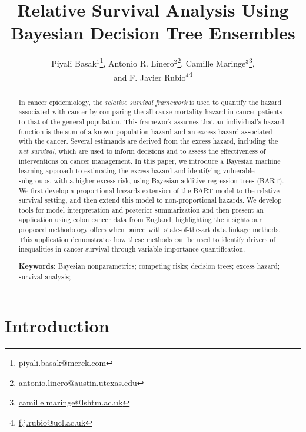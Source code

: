 \documentclass[12pt]{article}
\author{Piyali Basak$^{1}$\thanks{\href{mailto:piyali.basak@merck.com}{piyali.basak@merck.com}}, 
Antonio R. Linero$^{2}$\thanks{\href{mailto:antonio.linero@austin.utexas.edu}{antonio.linero@austin.utexas.edu}},  
Camille Maringe$^{3}$\thanks{\href{mailto:camille.maringe@lshtm.ac.uk}{camille.maringe@lshtm.ac.uk}}, \\ and
F. Javier Rubio$^{4}$\thanks{\href{mailto:f.j.rubio@ucl.ac.uk}{f.j.rubio@ucl.ac.uk}}}
\begin{document}
\title{Relative Survival Analysis Using \\Bayesian Decision Tree Ensembles}
\date{}
\maketitle

\begin{abstract}
  In cancer epidemiology, the \emph{relative survival framework} is used to quantify the hazard associated with cancer by comparing the all-cause mortality hazard in cancer patients to that of the general population. This framework assumes that an individual's hazard function is the sum of a known population hazard and an excess hazard associated with the cancer. Several estimands are derived from the excess hazard, including the \emph{net survival}, which are used to inform decisions and to assess the effectiveness of interventions on cancer management. In this paper, we introduce a Bayesian machine learning approach to estimating the excess hazard and identifying vulnerable subgroups, with a higher excess risk, using Bayesian additive regression trees (BART). We first develop a proportional hazards extension of the BART model to the relative survival setting, and then extend this model to non-proportional hazards. We develop tools for model interpretation and posterior summarization and then present an application using colon cancer data from England, highlighting the insights our proposed methodology offers when paired with state-of-the-art data linkage methods. This application demonstrates how these methods can be used to identify drivers of inequalities in cancer survival through variable importance quantification.

  \vspace{1em}
  \noindent \textbf{Keywords:} 
  Bayesian nonparametrics;
  competing risks;
  decision trees;
  excess hazard;
  survival analysis;
\end{abstract}

\doublespacing


\section{Introduction}\label{sec:intro}
\end{document}
